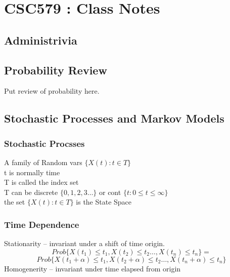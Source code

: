 \documentclass{article}
\begin{document}
\section{CSC579 : Class Notes}
\subsection {Administrivia}
\subsection{Probability Review}
Put review of probability here. 
\subsection{ Stochastic Processes and Markov Models }
	\subsubsection{Stochastic Procsses}
	  A family of Random vars $\{ X(t) : t\in T\}$ 
	\\\indent t is normally time  
    \\\indent T is called the index set 
    \\\indent T can be discrete $\{ 0,1,2,3 \ldots \}$ or cont $\{ t : 0 \le t \le \infty \}$
	\\\indent the set  $\{ X(t) : t \in T \}$ is the State Space 
	\\
	\subsubsection{Time Dependence}
	Stationarity -- invariant under a shift of time origin. 
	\[Prob\{ X(t_1) \le t_1, X(t_2) \le t_2 \ldots, X(t_n) \le t_n \} = \]
	\[Prob\{ X(t_1 + \alpha ) \le t_1, X(t_2 + \alpha ) \le t_2 \ldots, X(t_n +\alpha) \le t_n \}\]
	Homogenerity -- invariant under time elapsed from origin
	\\
\end{document}
